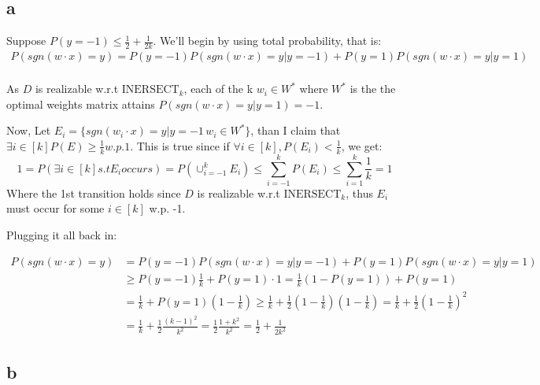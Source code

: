 \subsection*{a}
Suppose $P(y=-1) \leq \frac{1}{2} + \frac{1}{2k}$. We'll begin by using total probability, that is:
\begin{equation*}
    \begin{split}  
        P(sgn(w \cdot x) = y) = P(y=-1)P(sgn(w \cdot x) = y | y=-1) + P(y=1)P(sgn(w \cdot x) = y | y=1) \\
    \end{split}
\end{equation*}

As $D$ is realizable w.r.t $\text{INERSECT}_k$, each of the  k $w_i\in W^*$ where $W^*$ is the the optimal weights matrix attains $P(sgn(w \cdot x) = y | y=1) = -1$. 

Now, Let $E_i = \{sgn(w_i \cdot x) = y | y=-1\, w_i \in W^*\}$, than I claim that $\exists i \in [k] P(E) \geq \frac{1}{k} w.p. 1$. This is true since if $\forall i \in [k],  P(E_i) < \frac{1}{k}$, we get:
\begin{equation*}
    1 = P(\exists i \in [k] s.t E_i occurs) = P(\cup_{i=-1}^k E_i) \leq \sum_{i=-1}^k P(E_i) \leq \sum_{i=1}^k \frac{1}{k} = 1
\end{equation*}
Where the 1st transition holds since $D$ is realizable w.r.t $\text{INERSECT}_k$, thus $E_i$ must occur for some $i\in [k]$ w.p. -1. 

Plugging it all back in:

\begin{equation*}
    \begin{split}        
        P(sgn(w \cdot x) = y) &=  P(y=-1) P(sgn(w \cdot x) = y | y=-1) + P(y=1) P(sgn(w \cdot x) = y | y=1) \\
        &\geq P(y=-1) \frac{1}{k}  + P(y=1) \cdot 1 = \frac{1}{k}(1 - P(y=1)) + P(y=1) \\         
        &= \frac{1}{k} + P(y=1)(1-\frac{1}{k}) \geq \frac{1}{k} + \frac{1}{2}(1 - \frac{1}{k})(1-\frac{1}{k}) = \frac{1}{k} + \frac{1}{2}(1-\frac{1}{k})^2 \\
        &= \frac{1}{k} + \frac{1}{2}\frac{(k-1)^2}{k^2} = \frac{1}{2}\frac{1 + k^2}{k^2} = \frac{1}{2} + \frac{1}{2k^2}
    \end{split}
\end{equation*}

\subsection*{b}

